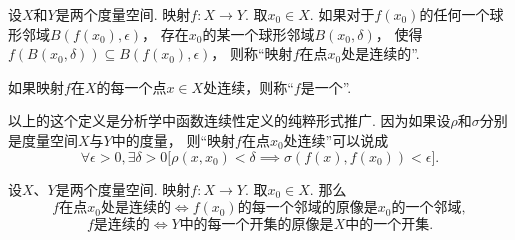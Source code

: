 \begin{definition}\label{definition:度量空间.连续映射的概念}
设\(X\)和\(Y\)是两个度量空间.
映射\(f\colon X \to Y\).
取\(x_0 \in X\).
如果对于\(f(x_0)\)的任何一个球形邻域\(B(f(x_0),\epsilon)\)，
存在\(x_0\)的某一个球形邻域\(B(x_0,\delta)\)，
使得\(f(B(x_0,\delta)) \subseteq B(f(x_0),\epsilon)\)，
则称“映射\(f\)在点\(x_0\)处是连续的”.

如果映射\(f\)在\(X\)的每一个点\(x \in X\)处连续，则称“\(f\)是一个”.
\end{definition}
以上的这个定义是分析学中函数连续性定义的纯粹形式推广.
因为如果设\(\rho\)和\(\sigma\)分别是度量空间\(X\)与\(Y\)中的度量，
则“映射\(f\)在点\(x_0\)处连续”可以说成\[
\forall\epsilon>0,
\exists\delta>0
\bigl[
\rho(x,x_0)<\delta
\implies
\sigma(f(x),f(x_0))<\epsilon
\bigr].
\]

\begin{theorem}\label{theorem:度量空间.度量空间下的连续映射与邻域的联系}
设\(X\)、\(Y\)是两个度量空间.
映射\(f\colon X \to Y\).
取\(x_0 \in X\).
那么\[
\text{\(f\)在点\(x_0\)处是连续的}
\iff
\text{\(f(x_0)\)的每一个邻域的原像是\(x_0\)的一个邻域},
\]\[
\text{\(f\)是连续的}
\iff
\text{\(Y\)中的每一个开集的原像是\(X\)中的一个开集}.
\]
\end{theorem}


\begingroup
\def\T{\mathfrak T}%
\def\oT{\overline{\mathfrak T}}%
